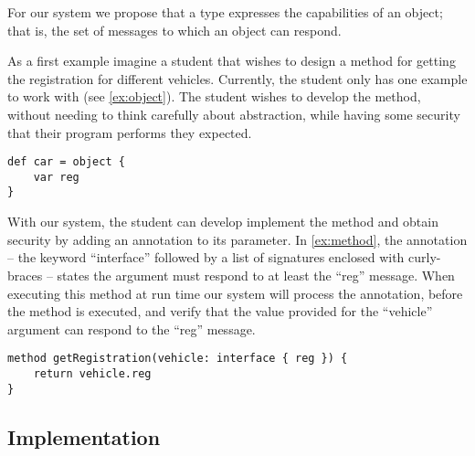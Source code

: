 For our system we propose that a type expresses the capabilities of an object;
that is, the set of messages to which an object can respond.

As a first example imagine a student that wishes to 
design a method for getting the registration for different vehicles. 
Currently, the student only has one example to work with (see \cref{ex:object}).
The student wishes to develop the method,
without needing to think carefully about abstraction,
while having some security that their program
performs they expected.

\begin{lstlisting}[label={ex:object},caption={An object literal with a field named ``reg'' and assigns it to the ``car'' variable.}]
def car = object {
    var reg
}
\end{lstlisting}

With our system, the student can develop implement the method and 
obtain security by adding an annotation to its parameter. 
In \cref{ex:method}, the annotation
-- the keyword ``interface'' followed by a list of signatures enclosed with curly-braces --
states the argument must respond to at least the ``reg'' message. 
When executing this method at run time
our system will process the annotation,
before the method is executed,
and verify that the value provided for the ``vehicle'' argument 
can respond to the ``reg'' message.

\begin{lstlisting}[label={ex:method},caption={A method with its argument annotated with an interface literal, stating that the value must respond to at least the ``reg'' message.}]
method getRegistration(vehicle: interface { reg }) {
    return vehicle.reg
}
\end{lstlisting}



\subsection{Implementation} 
\label{sec:implementation} 


